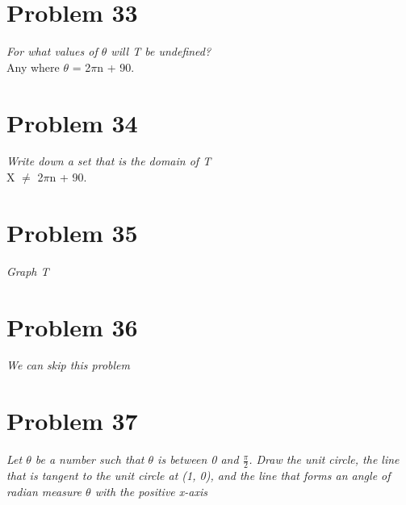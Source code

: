 \documentclass[11pt]{article} %
\newcommand\unitcirclenolines{
\draw[step=1cm,gray,very thin] (-2,-2) grid (2,2); %
\draw[thick, dashed] (-2,0) -- (0,0); %
\draw[thick, dashed] (0,-2) -- (0,0); %
\draw[thick, dashed] (0,0) -- (2,0) node[anchor=north west] {x}; %
\draw[thick, dashed] (0,0) -- (0,2) node[anchor=south east] {y}; %
\draw [thick] (0,0) circle (1cm);
}
\begin{document}
{\section{Problem 33}
\textit{For what values of $\theta$ will T be undefined?}
\\ Any where $\theta$ = 2$\pi$n + 90.

\section{Problem 34}
\textit{Write down a set that is the domain of T}
\\ X $\neq$ 2$\pi$n + 90.

\section{Problem 35}
\textit{Graph T}
\\

\section{Problem 36}
\textit{We can skip this problem}

\section{Problem 37}
\textit{Let $\theta$ be a number such that $\theta$ is between 0 and $\frac{\pi}{2}$. Draw the unit circle, the line that is tangent to the unit circle at (1, 0), and the line that forms an angle of radian measure $\theta$ with the positive x-axis}
\\

}
\end{document}
